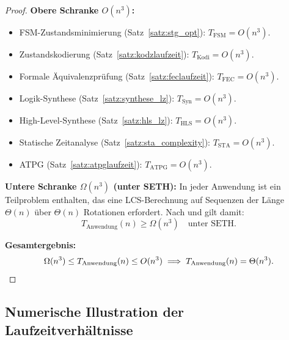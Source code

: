 ﻿\documentclass[a4paper,12pt]{article}
\theoremstyle{definition}
\begin{document}
\begin{proof}
  \textbf{Obere Schranke $O(n^3)$:}
  \begin{itemize}
    \item FSM-Zustandsminimierung (Satz~\ref{satz:stg_opt}): $T_{\text{FSM}} = O(n^3)$.
    \item Zustandskodierung (Satz~\ref{satz:kodzlaufzeit}): $T_{\text{Kodi}} = O(n^3)$.
    \item Formale Äquivalenzprüfung (Satz~\ref{satz:feclaufzeit}): $T_{\text{FEC}} = O(n^3)$.
    \item Logik-Synthese (Satz~\ref{satz:synthese_lz}): $T_{\text{Syn}} = O(n^3)$.
    \item High-Level-Synthese (Satz~\ref{satz:hls_lz}): $T_{\text{HLS}} = O(n^3)$.
    \item Statische Zeitanalyse (Satz~\ref{satz:sta_complexity}): $T_{\text{STA}} = O(n^3)$.
    \item ATPG (Satz~\ref{satz:atpglaufzeit}): $T_{\text{ATPG}} = O(n^3)$.
  \end{itemize}

  \textbf{Untere Schranke $\Omega(n^3)$ (unter SETH):}
  In jeder Anwendung ist ein Teilproblem enthalten, das eine LCS-Berechnung auf
  Sequenzen der Länge $\Theta(n)$ über $\Theta(n)$ Rotationen erfordert. Nach
  \cite[Satz~1]{subgraph2026} und \cite{abboud2015tight} gilt damit:
  \[
    T_{\text{Anwendung}}(n) \geq \Omega(n^3) \quad \text{unter SETH}.
  \]

  \textbf{Gesamtergebnis:}
  \[
    \Omega(n^3) \leq T_{\text{Anwendung}}(n) \leq O(n^3) \implies T_{\text{Anwendung}}(n) = \Theta(n^3).
    \qedhere
  \]
\end{proof}

\subsection{Numerische Illustration der Laufzeitverhältnisse}
\end{document}
